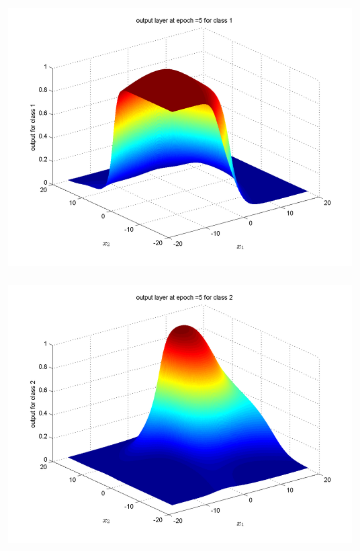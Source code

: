 \documentclass{article}
\begin{document}
\begin{flushleft}
% 
%  
%
% 
%  

\begin{figure}
\begin{subfigure}{.5\textwidth}
  \centering
  \includegraphics[width=.8\linewidth]{Classification/linearlySeparable/5_1}
 
\end{subfigure}%
\begin{subfigure}{.5\textwidth}
  \centering
  \includegraphics[width=.8\linewidth]{Classification/linearlySeparable/5_2}
  

\end{subfigure}
\end{figure}
\end{flushleft}
\end{document}

